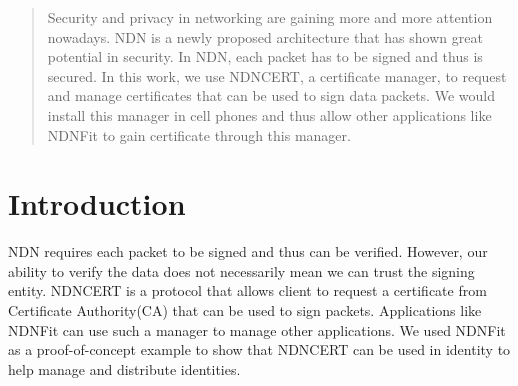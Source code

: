 \documentclass[a0,portrait]{poster}
\begin{document}
\begin{multicols}{2} %


\color{Navy} %

\begin{abstract}

Security and privacy in networking are gaining more and more attention nowadays. NDN is a newly proposed architecture that has shown great potential in security. In NDN, each packet has to be signed and thus is secured. In this work, we use NDNCERT, a certificate manager, to request and manage certificates that can be used to sign data packets. We would install this manager in cell phones and thus allow other applications like NDNFit to gain certificate through this manager. 

\end{abstract}


\color{SaddleBrown} %

\section*{Introduction}
NDN requires each packet to be signed and thus can be verified. However, our ability to verify the data does not necessarily mean we can trust the signing entity. NDNCERT is a protocol that allows client to request a certificate from Certificate Authority(CA) that can be used to sign packets. Applications like NDNFit can use such a manager to manage other applications. We used NDNFit as a proof-of-concept example to show that NDNCERT can be used in identity to help manage and distribute identities.


\color{DarkSlateGray} %


\end{multicols}
\end{document}
